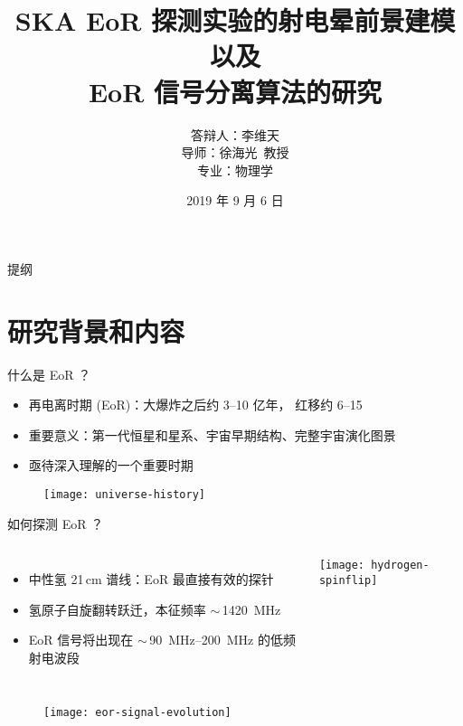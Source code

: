 \documentclass{beamer}
\title{%
  SKA EoR 探测实验的射电晕前景建模以及\texorpdfstring{\\}{ }%
  EoR 信号分离算法的研究%
}
\author{%
  答辩人：李维天\texorpdfstring{\\}{ / }
  导师：徐海光~教授\texorpdfstring{\\}{ / }
  专业：物理学
}
\institute{%
  物理与天文学院\\%
  上海交通大学%
}
\date{\small 2019 年 9 月 6 日}
\begin{document}
\maketitle

\begin{frame}{提\cspace{}纲}
  \tableofcontents[hideallsubsections]
\end{frame}


\section{研究背景和内容}

\begin{frame}{什么是 EoR ？}
  \begin{itemize}
    \item \alert{再电离时期 (EoR)}：大爆炸之后约 \numrange{3}{10} 亿年，
      红移约 \numrange{6}{15}
    \item \alert{重要意义}：第一代恒星和星系、宇宙早期结构、完整宇宙演化图景
    \item 亟待深入理解的一个重要时期
  \end{itemize}

  \vspace{-1ex}
  \begin{figure}
    \centering
    \texttt{[image: universe-history]}
  \end{figure}
\end{frame}

\begin{frame}{如何探测 EoR ？}
  \begin{columns}
  \begin{itemize}
    \item \alert{中性氢 21\,cm 谱线}：EoR 最直接有效的探针
    \item 氢原子自旋翻转跃迁，本征频率 $\sim$\,\SI{1420}{\MHz}
    \item EoR 信号将出现在 $\sim$\,\SIrange{90}{200}{\MHz}
      的\alert{低频射电波段}
  \end{itemize}

    \texttt{[image: hydrogen-spinflip]}
  \end{columns}

  \vspace{-1ex}
  \begin{figure}
    \centering
    \texttt{[image: eor-signal-evolution]}
  \end{figure}
\end{frame}
\end{document}
